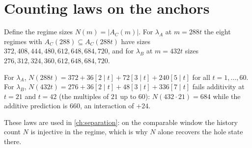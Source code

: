 \section{Counting laws on the anchors}
Define the regime sizes $N(m)=|A_C(m)|$. For $\lambda_A$ at $m=288t$ the eight regimes with $A_C(288)\subseteq A_C(288t)$ have sizes $372,408,444,480,612,648,684,720$, and for $\lambda_B$ at $m=432t$ sizes $276,312,324,360,612,648,684,720$.
\begin{observation}\label{obs:counting}
For $\lambda_A$, $N(288t)=372+36[2\mid t]+72[3\mid t]+240[5\mid t]$ for all $t=1,\dots,60$. For $\lambda_B$, $N(432t)=276+36[2\mid t]+48[3\mid t]+336[7\mid t]$ fails additivity at $t=21$ and $t=42$ (the multiples of $21$ up to $60$): $N(432\cdot21)=684$ while the additive prediction is $660$, an interaction of $+24$.
\end{observation}
These laws are used in \cref{ch:separation}: on the comparable window the history count $N$ is injective in the regime, which is why $N$ alone recovers the hole state there.
